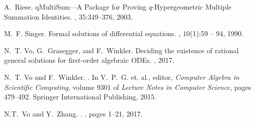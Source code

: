 \documentclass[10pt,a4paper]{article}
\begin{document}
\begin{thebibliography}{10}
A.~Riese.
\newblock qMultiSum---A Package for Proving $q$-Hypergeometric Multiple Summation Identities.
, 35:349--376, 2003.



M.~F. Singer.
\newblock Formal solutions of differential equations.
, 10(1):59 -- 94, 1990.




N.~T. Vo, G.~Grasegger, and F.~Winkler.
\newblock Deciding the existence of rational general solutions for first-order
  algebraic {ODEs}.
, 2017.

N.~T. Vo and F.~Winkler.
.
\newblock In V.~P.~G. et. al., editor, {\em {Computer Algebra in Scientific
  Computing}}, volume 9301 of {\em Lecture Notes in Computer Science}, pages
  479--492. Springer International Publishing, 2015.
  
  

N.T.~Vo and Y.~Zhang.
.
, pages 1--21,  2017.


\end{thebibliography}
\end{document}
